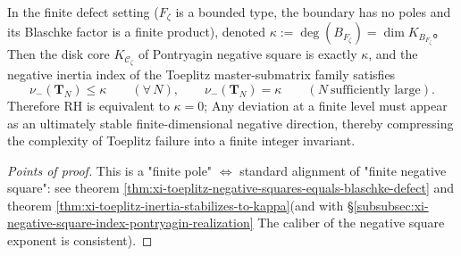 \begin{conclusion}\label{con:xi-toeplitz-negative-square-stability-law}
In the finite defect setting (\(F_{\zeta}\) is a bounded type, the boundary has no poles and its Blaschke factor is a finite product), denoted
\(\kappa:=\deg(B_{F_{\zeta}})=\dim K_{B_{F_{\zeta}}}\)。
Then the disk core \(K_{\mathscr{C}_{\zeta}}\) of Pontryagin negative square is exactly \(\kappa\), and the negative inertia index of the Toeplitz master-submatrix family satisfies
\[
\nu_-(\mathbf{T}_N)\le \kappa\qquad(\forall\,N),
\qquad
\nu_-(\mathbf{T}_N)=\kappa\qquad(N\ \text{sufficiently large}).
\]
Therefore RH is equivalent to \(\kappa=0\); Any deviation at a finite level must appear as an ultimately stable finite-dimensional negative direction, thereby compressing the complexity of Toeplitz failure into a finite integer invariant.
\end{conclusion}
\begin{proof}[Points of proof]
This is a "finite pole" \(\Longleftrightarrow\) standard alignment of "finite negative square": see theorem \ref{thm:xi-toeplitz-negative-squares-equals-blaschke-defect} and theorem \ref{thm:xi-toeplitz-inertia-stabilizes-to-kappa}(and with \S\ref{subsubsec:xi-negative-square-index-pontryagin-realization} The caliber of the negative square exponent is consistent).
\end{proof}

